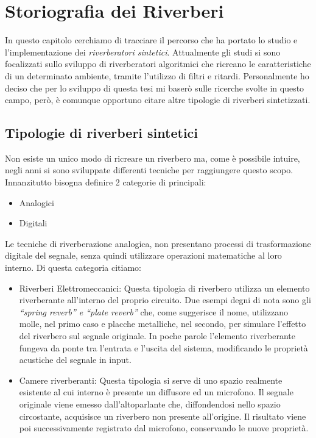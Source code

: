 
\chapter{Storiografia dei Riverberi}
\label{chp:Storiografia dei Riverberi}

In questo capitolo cerchiamo di tracciare il percorso che ha portato lo studio e l’implementazione dei \textit{riverberatori sintetici}. Attualmente gli studi si sono focalizzati sullo sviluppo di riverberatori algoritmici che ricreano le caratteristiche di un determinato ambiente, tramite l’utilizzo di filtri e ritardi. Personalmente ho deciso che per lo sviluppo di questa tesi mi baserò sulle ricerche svolte in questo campo, però, è comunque opportuno citare altre tipologie di riverberi sintetizzati.

\section{Tipologie di riverberi sintetici}

Non esiste un unico modo di ricreare un riverbero ma, come è possibile intuire, negli anni si sono sviluppate differenti tecniche per raggiungere questo scopo.
Innanzitutto bisogna definire 2 categorie di principali:

\begin{itemize}
\item Analogici
\item Digitali
\end{itemize}

Le tecniche di riverberazione analogica, non presentano processi di trasformazione digitale del segnale, senza quindi utilizzare operazioni matematiche al loro interno.
Di questa categoria citiamo:

\begin{itemize}
\item Riverberi Elettromeccanici: Questa tipologia di riverbero utilizza un elemento riverberante all’interno del proprio circuito. Due esempi degni di nota sono gli \emph{“spring reverb” e “plate reverb”} che, come suggerisce il nome, utilizzano molle, nel primo caso e placche metalliche, nel secondo, per simulare l’effetto del riverbero sul segnale originale. In poche parole l’elemento riverberante fungeva da ponte tra l’entrata e l’uscita del sistema, modificando le proprietà acustiche del segnale in input.
\item Camere riverberanti: Questa tipologia si serve di uno spazio realmente esistente al cui interno è presente un diffusore ed un microfono. Il segnale originale viene emesso dall’altoparlante che, diffondendosi nello spazio circostante, acquisisce un riverbero non presente all’origine. Il risultato viene poi successivamente registrato dal microfono, conservando le nuove proprietà. 
\end{itemize}

